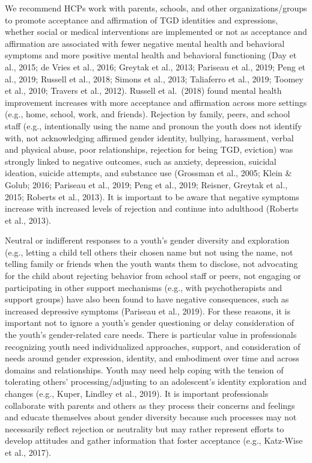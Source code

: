 \documentclass[
]{book}
\begin{document}
We recommend HCPs work with parents,
schools, and other organizations/groups to promote acceptance and affirmation of TGD identities
and expressions, whether social or medical interventions are implemented or not as acceptance
and affirmation are associated with fewer negative
mental health and behavioral symptoms and more
positive mental health and behavioral functioning
(Day et al., 2015; de Vries et al., 2016; Greytak
et al., 2013; Pariseau et al., 2019; Peng et al., 2019;
Russell et al., 2018; Simons et al., 2013; Taliaferro
et al., 2019; Toomey et al., 2010; Travers et al.,
2012). Russell et al.~(2018) found mental health
improvement increases with more acceptance and
affirmation across more settings (e.g., home,
school, work, and friends). Rejection by family,
peers, and school staff (e.g., intentionally using
the name and pronoun the youth does not identify
with, not acknowledging affirmed gender identity,
bullying, harassment, verbal and physical abuse,
poor relationships, rejection for being TGD, eviction) was strongly linked to negative outcomes,
such as anxiety, depression, suicidal ideation, suicide attempts, and substance use (Grossman et al.,
2005; Klein \& Golub; 2016; Pariseau et al., 2019;
Peng et al., 2019; Reisner, Greytak et al., 2015;
Roberts et al., 2013). It is important to be aware
that negative symptoms increase with increased
levels of rejection and continue into adulthood
(Roberts et al., 2013).

Neutral or indifferent responses to a youth's
gender diversity and exploration (e.g., letting a
child tell others their chosen name but not using
the name, not telling family or friends when the
youth wants them to disclose, not advocating
for the child about rejecting behavior from
school staff or peers, not engaging or participating in other support mechanisms (e.g., with
psychotherapists and support groups) have also
been found to have negative consequences, such
as increased depressive symptoms (Pariseau
et al., 2019). For these reasons, it is important
not to ignore a youth's gender questioning or
delay consideration of the youth's gender-related
care needs. There is particular value in professionals recognizing youth need individualized
approaches, support, and consideration of needs
around gender expression, identity, and embodiment over time and across domains and relationships. Youth may need help coping with the
tension of tolerating others' processing/adjusting
to an adolescent's identity exploration and
changes (e.g., Kuper, Lindley et al., 2019). It is
important professionals collaborate with parents
and others as they process their concerns and
feelings and educate themselves about gender
diversity because such processes may not necessarily reflect rejection or neutrality but may
rather represent efforts to develop attitudes and
gather information that foster acceptance (e.g.,
Katz-Wise et al., 2017).
\end{document}

